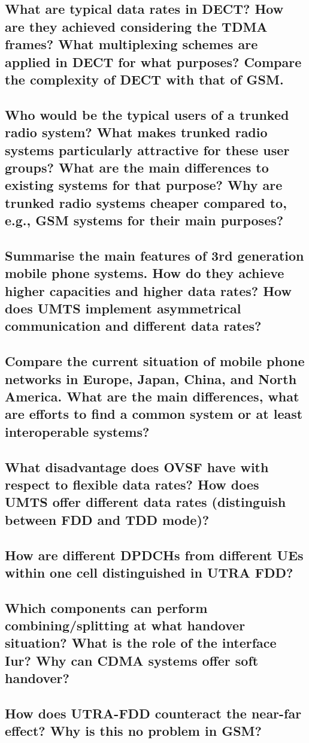 \subsection{What are typical data rates in DECT? How are they achieved considering the TDMA frames? What multiplexing schemes are applied in DECT for what purposes? Compare the complexity of DECT with that of GSM.}

\subsection{Who would be the typical users of a trunked radio system? What makes trunked radio systems particularly attractive for these user groups? What are the main differences to existing systems for that purpose? Why are trunked radio systems cheaper compared to, e.g., GSM systems for their main purposes?}

\subsection{Summarise the main features of 3rd generation mobile phone systems. How do they achieve higher capacities and higher data rates? How does UMTS implement asymmetrical communication and different data rates?}

\subsection{Compare the current situation of mobile phone networks in Europe, Japan, China, and North America. What are the main differences, what are efforts to find a common system or at least interoperable systems?}

\subsection{What disadvantage does OVSF have with respect to flexible data rates? How does UMTS offer different data rates (distinguish between FDD and TDD mode)?}

\subsection{How are different DPDCHs from different UEs within one cell distinguished in UTRA FDD?}

\subsection{Which components can perform combining/splitting at what handover situation? What is the role of the interface Iur? Why can CDMA systems offer soft handover?}

\subsection{How does UTRA-FDD counteract the near-far effect? Why is this no problem in GSM?}



